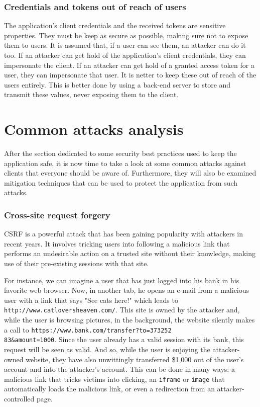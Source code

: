 \subsubsection{Credentials and tokens out of reach of users}
The application's client credentials and the received tokens are sensitive properties. They must be keep as secure as possible, making sure not to expose them to users. It is assumed that, if a user can see them, an attacker can do it too. If an attacker can get hold of the application's client credentials, they can impersonate the client. If an attacker can get hold of a granted access token for a user, they can impersonate that user. It is netter to keep these out of reach of the users entirely. This is better done by using a back-end server to store and transmit these values, never exposing them to the client.

\section{Common attacks analysis}
After the section dedicated to some security best practices used to keep the application safe, it is now time to take a look at some common attacks against \textit{\oauth} clients that everyone should be aware of. Furthermore, they will also be examined mitigation techniques that can be used to protect the application from such attacks.

\subsubsection{Cross-site request forgery}
\label{csrf}
CSRF is a powerful attack that has been gaining popularity with attackers in recent years. It involves tricking users into following a malicious link that performs an undesirable action on a trusted site without their knowledge, making use of their pre-existing sessions with that site.

For instance, we can imagine a user that has just logged into his bank in his favorite web browser. Now, in another tab, he opens an e-mail from a malicious user with a link that says "See cats here!" which leads to \texttt{http://www.catloversheaven.com/}.
This site is owned by the attacker and, while the user is browsing pictures, in the background, the website silently makes a call to \texttt{https://www.bank.com/transfer?to=373252 \\ 83\&amount=1000}.
Since the user already has a valid session with its bank, this request will be seen as valid. And so, while the user is enjoying the attacker-owned website, they have also unwittingly transferred \$1,000 out of the user's account and into the
attacker's account. This can be done in many ways: a malicious link that tricks victims into clicking, an \texttt{iframe} or \texttt{image} that automatically loads the malicious link, or even a redirection from an attacker-controlled page.

